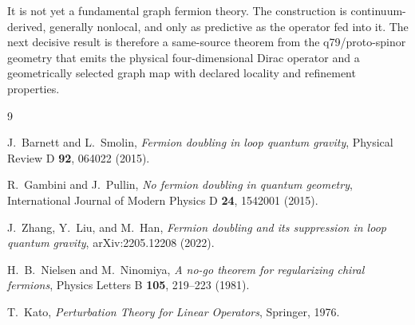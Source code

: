 \documentclass[11pt]{article}
\begin{document}
It is not yet a fundamental graph fermion theory. The construction is
continuum-derived, generally nonlocal, and only as predictive as the operator
fed into it. The next decisive result is therefore a same-source theorem from
the q79/proto-spinor geometry that emits the physical four-dimensional Dirac
operator and a geometrically selected graph map with declared locality and
refinement properties.

\begin{thebibliography}{9}

J.~Barnett and L.~Smolin,
\emph{Fermion doubling in loop quantum gravity},
Physical Review D \textbf{92}, 064022 (2015).

R.~Gambini and J.~Pullin,
\emph{No fermion doubling in quantum geometry},
International Journal of Modern Physics D \textbf{24}, 1542001 (2015).

J.~Zhang, Y.~Liu, and M.~Han,
\emph{Fermion doubling and its suppression in loop quantum gravity},
arXiv:2205.12208 (2022).

H.~B.~Nielsen and M.~Ninomiya,
\emph{A no-go theorem for regularizing chiral fermions},
Physics Letters B \textbf{105}, 219--223 (1981).

T.~Kato,
\emph{Perturbation Theory for Linear Operators},
Springer, 1976.

\end{thebibliography}
\end{document}

